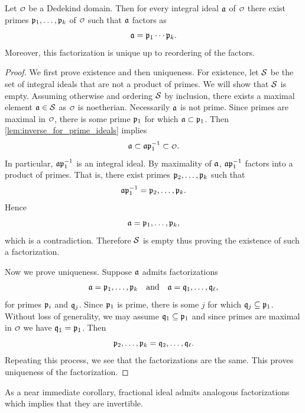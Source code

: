     \begin{theorem}\label{thm:unique_product_prime_ideals}
      Let \(\smc{O}\) be a Dedekind domain. Then for every integral ideal \(\mathfrak{a}\) of \(\smc{O}\) there exist primes \(\mathfrak{p}_{1},\ldots,\mathfrak{p}_{k}\) of \(\smc{O}\) such that \(\mathfrak{a}\) factors as
      \[
        \mathfrak{a} = \mathfrak{p}_{1} \cdots \mathfrak{p}_{k}.
      \]
      Moreover, this factorization is unique up to reordering of the factors.
    \end{theorem}
    \begin{proof}
      We first prove existence and then uniqueness. For existence, let \(\mathcal{S}\) be the set of integral ideals that are not a product of primes. We will show that \(\mathcal{S}\) is empty. Assuming otherwise and ordering \(\mathcal{S}\) by inclusion, there exists a maximal element \(\mathfrak{a} \in \mathcal{S}\) as \(\smc{O}\) is noetherian. Necessarily \(\mathfrak{a}\) is not prime. Since primes are maximal in \(\smc{O}\), there is some prime \(\mathfrak{p}_{1}\) for which \(\mathfrak{a} \subset \mathfrak{p}_{1}\). Then \cref{lem:inverse_for_prime_ideals} implies
      \[
        \mf{a} \subset \mf{a}\mf{p}_{1}^{-1} \subset \smc{O}.
      \]
      In particular, \(\mathfrak{a}\mathfrak{p}_{1}^{-1}\) is an integral ideal. By maximality of \(\mathfrak{a}\), \(\mathfrak{a}\mathfrak{p}_{1}^{-1}\) factors into a product of primes. That is, there exist primes \(\mathfrak{p}_{2},\ldots,\mathfrak{p}_{k}\) such that
      \[
        \mathfrak{a}\mathfrak{p}_{1}^{-1} = \mathfrak{p}_{2},\ldots,\mathfrak{p}_{k}.
      \]
      Hence
      \[
        \mathfrak{a} = \mathfrak{p}_{1},\ldots,\mathfrak{p}_{k},
      \]
      which is a contradiction. Therefore \(\mathcal{S}\) is empty thus proving the existence of such a factorization.
      
      Now we prove uniqueness. Suppose \(\mathfrak{a}\) admits factorizations
      \[
        \mathfrak{a} = \mathfrak{p}_{1},\ldots,\mathfrak{p}_{k} \quad \text{and} \quad \mathfrak{a} = \mathfrak{q}_{1},\ldots,\mathfrak{q}_{\ell},
      \]
      for primes \(\mathfrak{p}_{i}\) and \(\mathfrak{q}_{j}\). Since \(\mathfrak{p}_{1}\) is prime, there is some \(j\) for which \(\mathfrak{q}_{j} \subseteq \mathfrak{p}_{1}\). Without loss of generality, we may assume \(\mathfrak{q}_{1} \subseteq \mathfrak{p}_{1}\) and since primes are maximal in \(\smc{O}\) we have \(\mathfrak{q}_{1} = \mathfrak{p}_{1}\). Then
      \[
        \mathfrak{p}_{2},\ldots,\mathfrak{p}_{k} = \mathfrak{q}_{2},\ldots,\mathfrak{q}_{\ell}.
      \]
      Repeating this process, we see that the factorizations are the same. This proves uniqueness of the factorization.
    \end{proof}

    As a near immediate corollary, fractional ideal admits analogous factorizations which implies that they are invertible.

